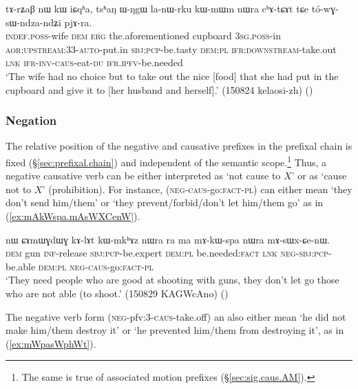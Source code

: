 \begin{exe}
\ex \label{ex:toWGsWndzandZi.pjAra}
\gll tɤ-rʑaβ nɯ kɯ iɕqʰa, tsʰaŋ ɯ-ŋgɯ la-nɯ-rku kɯ-mɯm nɯra cʰɤ-tɕɤt tɕe tó-wɣ-sɯ-ndza-ndʑi pjɤ-ra. \\
\textsc{indef}.\textsc{poss}-wife \textsc{dem} \textsc{erg} the.aforementioned cupboard \textsc{3sg}.\textsc{poss}-in \textsc{aor}:\textsc{upstream}:3\fl{}3-\textsc{auto}-put.in \textsc{sbj}:\textsc{pcp}-be.tasty \textsc{dem}:\textsc{pl} \textsc{ifr}:\textsc{downstream}-take.out \textsc{lnk} \textsc{ifr}-\textsc{inv}-\textsc{caus}-eat-\textsc{du} \textsc{ifr}.\textsc{ipfv}-be.needed \\
\glt `The wife had no choice but to take out the nice [food] that she had put in the cupboard and give it to [her husband and herself].' (150824 kelaosi-zh)
()
\end{exe}


\subsubsection{Negation} \label{sec:sig.caus.negation}
The relative position of the negative and causative prefixes in the prefixal chain is fixed (§\ref{sec:prefixal.chain}) and independent of the semantic scope.\footnote{The same is true of associated motion prefixes (§\ref{sec:sig.caus.AM}). } Thus, a negative causative verb can be either  interpreted as `not cause to $X$' or as `cause not to $X$' (prohibition).   For instance,  (\textsc{neg}-\textsc{caus}-go:\textsc{fact}-\textsc{pl}) can either mean `they don't send him/them' or `they prevent/forbid/don't let him/them go' as in (\ref{ex:mAkWspa.mAsWXCenW}).
 
\begin{exe}
\ex \label{ex:mAkWspa.mAsWXCenW}
\gll nɯ ɕɤmɯɣdɯɣ kɤ-lɤt kɯ-mkʰɤz nɯra ra ma mɤ-kɯ-spa nɯra mɤ-sɯx-ɕe-nɯ. \\
\textsc{dem} gun \textsc{inf}-release \textsc{sbj}:\textsc{pcp}-be.expert \textsc{dem}:\textsc{pl} be.needed:\textsc{fact} \textsc{lnk} \textsc{neg}-\textsc{sbj}:\textsc{pcp}-be.able \textsc{dem}:\textsc{pl} \textsc{neg}-\textsc{caus}-go:\textsc{fact}-\textsc{pl} \\
\glt `They need people who are good at shooting with guns, they don't let go those who are not able (to shoot.' (150829 KAGWcAno)
()
\end{exe}
 
The negative verb form  (\textsc{neg}-pfv:3\flobv{}-\textsc{caus}-take.off) an also either mean `he did not make him/them destroy it' or `he prevented him/them from destroying it', as in (\ref{ex:mWpasWphWt}).

